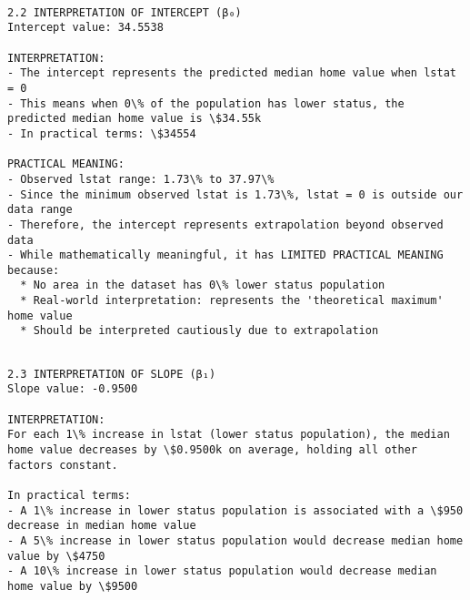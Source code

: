 \documentclass[8pt, twocolumn]{extarticle}
\begin{document}
    \begin{Verbatim}[commandchars=\\\{\}]

2.2 INTERPRETATION OF INTERCEPT (β₀)
Intercept value: 34.5538

INTERPRETATION:
- The intercept represents the predicted median home value when lstat = 0
- This means when 0\% of the population has lower status, the predicted median home value is \$34.55k
- In practical terms: \$34554

PRACTICAL MEANING:
- Observed lstat range: 1.73\% to 37.97\%
- Since the minimum observed lstat is 1.73\%, lstat = 0 is outside our data range
- Therefore, the intercept represents extrapolation beyond observed data
- While mathematically meaningful, it has LIMITED PRACTICAL MEANING because:
  * No area in the dataset has 0\% lower status population
  * Real-world interpretation: represents the 'theoretical maximum' home value
  * Should be interpreted cautiously due to extrapolation
    \end{Verbatim}

    \begin{Verbatim}[commandchars=\\\{\}]

2.3 INTERPRETATION OF SLOPE (β₁)
Slope value: -0.9500

INTERPRETATION:
For each 1\% increase in lstat (lower status population), the median home value decreases by \$0.9500k on average, holding all other factors constant.

In practical terms:
- A 1\% increase in lower status population is associated with a \$950 decrease in median home value
- A 5\% increase in lower status population would decrease median home value by \$4750
- A 10\% increase in lower status population would decrease median home value by \$9500
    \end{Verbatim}
    
\end{document}
